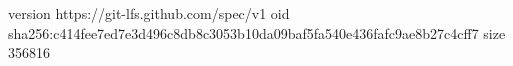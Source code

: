 version https://git-lfs.github.com/spec/v1
oid sha256:c414fee7ed7e3d496c8db8c3053b10da09baf5fa540e436fafc9ae8b27c4cff7
size 356816

